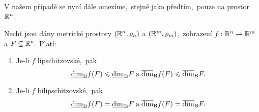 V našem případě se nyní dále omezíme,~stejně jako předtím,~pouze na prostor $\mathbb{R}^n$.

\begin{theorem}\label{thm:bc-dimenze-bi-lipschitzovska-zobrazeni}
    Nechť jsou dány metrické prostory $(\mathbb{R}^n,\varrho_n)$ a $(\mathbb{R}^m,\varrho_m)$,~zobrazení $f:\mathbb{R}^n \rightarrow \mathbb{R}^m$ a $F\subseteq\mathbb{R}^n$. Platí:
    \begin{enumerate}[label=(\roman*)]
        \item\label{thm:bc-dimenze-lipschitz} Je-li $f$ lipschitzovské,~pak
        \[\underline{\dim}_\textup{B}{f(F)}\leqslant\underline{\dim}_\textup{B}{F}\;\text{a}\;\overline{\dim}_\textup{B}{f(F)}\leqslant\overline{\dim}_\textup{B}{F}.\]
        \item\label{thm:bc-dimenze-bilipschitz} Je-li $f$ bilipschitzovské,~pak
        \[\underline{\dim}_\textup{B}{f(F)}=\underline{\dim}_\textup{B}{F}\;\text{a}\;\overline{\dim}_\textup{B}{f(F)}=\overline{\dim}_\textup{B}{F}.\]
    \end{enumerate}
\end{theorem}
